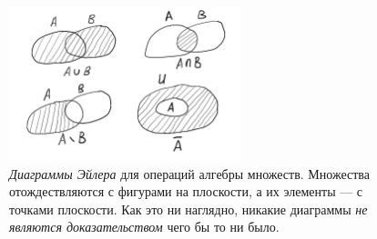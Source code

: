 \documentclass[12pt,notitlepage]{article}
\theoremstyle{plain}
\theoremstyle{definition}
\theoremstyle{plain}
\newcommand{\1}{\mathbf{1}}
\newcommand{\0}{\mathbf{0}}
\begin{document}
\begin{figure}[h]
	\centering
	\includegraphics*[width=0.6\textwidth]{set_algebra.pdf}
	\caption{\emph{Диаграммы Эйлера} для операций алгебры множеств. Множества отождествляются с фигурами на плоскости, а их элементы --- с точками плоскости. Как это ни наглядно, никакие диаграммы \emph{не являются доказательством} чего бы то ни было.}
\end{figure}
\end{document}
